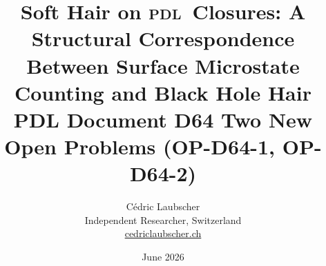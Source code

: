 \documentclass[12pt,a4paper]{article}
\newcommand{\PDL}{\textsc{pdl}}
\begin{document}
\title{\textbf{Soft Hair on \PDL\ Closures: A Structural Correspondence
Between Surface Microstate Counting and Black Hole Hair}\\[6pt] {\large PDL Document D64 \textemdash{} Two New Open Problems (OP-D64-1, OP-D64-2)}}

\author{C\'edric Laubscher\\[4pt]
\small Independent Researcher, Switzerland\\
\small \href{https://cedriclaubscher.ch}{cedriclaubscher.ch}}

\date{June 2026}

\maketitle

\end{document}
